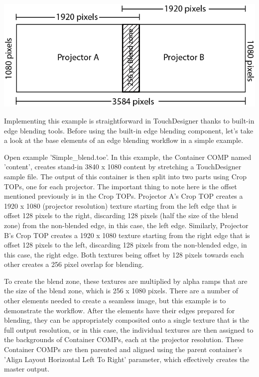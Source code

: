 \begin{fullwidth}
\begin{center}
\includegraphics{./img/10.5/full_image_layout.png}
\end{center}

Implementing this example is straightforward in TouchDesigner thanks to built-in edge blending tools. Before using the built-in edge blending component, let's take a look at the base elements of an edge blending workflow in a simple example.

Open example 'Simple\_blend.toe'. In this example, the Container COMP named 'content', creates stand-in 3840 x 1080 content by stretching a TouchDesigner sample file. The output of this container is then split into two parts using Crop TOPs, one for each projector. The important thing to note here is the offset mentioned previously is in the Crop TOPs. Projector A's Crop TOP creates a 1920 x 1080 (projector resolution) texture starting from the left edge that is offset 128 pixels to the right, discarding 128 pixels (half the size of the blend zone) from the non-blended edge, in this case, the left edge. Similarly, Projector B's Crop TOP creates a 1920 x 1080 texture starting from the right edge that is offset 128 pixels to the left, discarding 128 pixels from the non-blended edge, in this case, the right edge. Both textures being offset by 128 pixels towards each other creates a 256 pixel overlap for blending. 

To create the blend zone, these textures are multiplied by alpha ramps that are the size of the blend zone, which is 256 x 1080 pixels. There are a number of other elements needed to create a seamless image, but this example is to demonstrate the workflow. After the elements have their edges prepared for blending, they can be appropriately composited onto a single texture that is the full output resolution, or in this case, the individual textures are then assigned to the backgrounds of Container COMPs, each at the projector resolution. These Container COMPs are then parented and aligned using the parent container's 'Align Layout Horizontal Left To Right' parameter, which effectively creates the master output.


\end{fullwidth}
